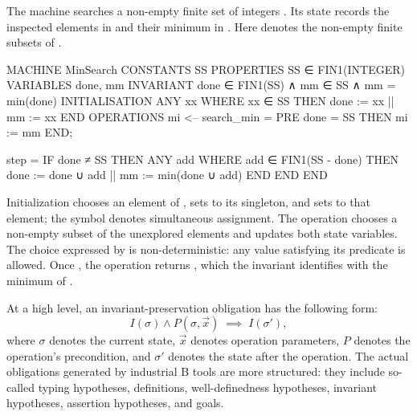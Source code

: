 \begin{example}
\label{ex:minsearch-machine}
The machine  searches a non-empty finite set of integers .
Its state records the inspected elements in  and their minimum in .
Here  denotes the non-empty finite subsets of .
\begin{blisting}[title={The abstract machine \texttt{MinSearch}.},
    label={lst:minsearch-machine}]
MACHINE MinSearch
CONSTANTS  SS
PROPERTIES SS ∈ FIN1(INTEGER)
VARIABLES  done, mm
INVARIANT
  done ∈ FIN1(SS) ∧ mm ∈ SS ∧ mm = min(done)
INITIALISATION
  ANY xx WHERE xx ∈ SS THEN done := {xx} || mm := xx END
OPERATIONS
  mi <-- search_min = PRE done = SS THEN mi := mm END;

  step =
    IF done ≠ SS THEN
      ANY add WHERE add ∈ FIN1(SS - done) THEN
        done := done ∪ add || mm := min(done ∪ add)
      END
    END
END
\end{blisting}
Initialization chooses an element  of , sets  to its
singleton, and sets  to that element; the symbol \binl{||} denotes simultaneous
assignment.
The operation  chooses a non-empty subset of the unexplored elements and
updates both state variables.
The choice expressed by  is non-deterministic: any value satisfying its
 predicate is allowed.
Once , the operation  returns , which the
invariant identifies with the minimum of .
\end{example}

At a high level, an invariant-preservation obligation has the following form:
\[
  I(\sigma) \land P(\sigma, \vec x) \;\implies\; I(\sigma'),
\]
where \(\sigma\) denotes the current state, \(\vec x\) denotes operation parameters, \(P\) denotes the operation's precondition, and \(\sigma'\) denotes the state after the operation.
The actual obligations generated by industrial B tools are more structured: they include so-called typing hypotheses, definitions, well-definedness hypotheses, invariant hypotheses, assertion hypotheses, and goals.

